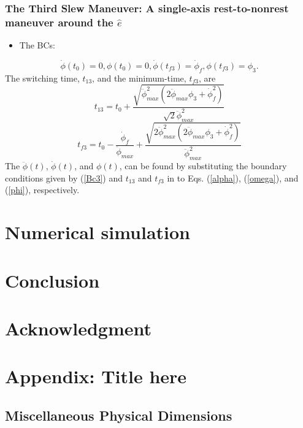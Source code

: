 \documentclass[letterpaper, preprint, paper,11pt]{AAS}	%
\begin{document}
	\subsubsection{The Third Slew Maneuver: A single-axis rest-to-nonrest maneuver around the $\hat{e}$}
	
	
	\begin{itemize}
		\item The BCs: 
	\end{itemize}
	\begin{equation}\label{Bc3}
	\dot{\phi}(t_0)=0,\phi(t_0)=0, \dot{\phi}(t_{f3})=\dot{\phi}_{f},\phi(t_{f3})=\phi_3.
	\end{equation}
	The switching time, $t_{13}$, and the minimum-time, $t_{f3}$, are
	\begin{equation}\label{t31}
	t_{13}=t_0+\frac{\sqrt{\ddot{\phi}_{max}^2(2\ddot{\phi}_{max}\phi_3+\dot{\phi}_{f}^2)}}{\sqrt{2}\ddot{\phi}_{max}^2}
	\end{equation}
	\begin{equation}\label{tf3}
	t_{f3}=t_0-\frac{\dot{\phi}_{f}}{\ddot{\phi}_{max}}+\frac{\sqrt{2\ddot{\phi}_{max}^2(2\ddot{\phi}_{max}\phi_3+\dot{\phi}_{f}^2)}}{\ddot{\phi}_{max}^2}
	\end{equation}
	The $\ddot{\phi}(t)$, $\dot{\phi}(t)$, and  $\phi(t)$,  can be found by substituting the boundary conditions given by (\ref{Bc3}) and $t_{13}$ and $t_{f3}$ in to Eqs. (\ref{alpha}), (\ref{omega}), and (\ref{phi}), respectively.
	
	
	\section{Numerical simulation} 
	
	\section{Conclusion}
	
	\section{Acknowledgment}
	
	\appendix
	\section*{Appendix: Title here}
	
	\subsection*{Miscellaneous Physical Dimensions}
	
	
	
	
\end{document}
